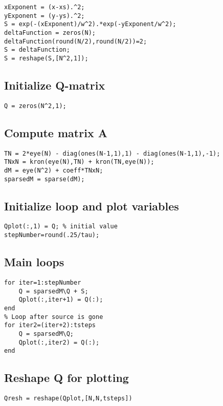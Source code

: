 \begin{verbatim}
xExponent = (x-xs).^2;
yExponent = (y-ys).^2;
S = exp(-(xExponent)/w^2).*exp(-yExponent/w^2);
deltaFunction = zeros(N);
deltaFunction(round(N/2),round(N/2))=2;
S = deltaFunction;
S = reshape(S,[N^2,1]);
\end{verbatim}


\subsection*{Initialize Q-matrix}

\begin{verbatim}
Q = zeros(N^2,1);
\end{verbatim}


\subsection*{Compute matrix A}

\begin{verbatim}
TN = 2*eye(N) - diag(ones(N-1,1),1) - diag(ones(N-1,1),-1);
TNxN = kron(eye(N),TN) + kron(TN,eye(N));
dM = eye(N^2) + coeff*TNxN;
sparsedM = sparse(dM);
\end{verbatim}


\subsection*{Initialize loop and plot variables}

\begin{verbatim}
Qplot(:,1) = Q; % initial value
stepNumber=round(.25/tau);
\end{verbatim}


\subsection*{Main loops}

\begin{verbatim}
for iter=1:stepNumber
    Q = sparsedM\Q + S;
    Qplot(:,iter+1) = Q(:);
end
% Loop after source is gone
for iter2=(iter+2):tsteps
    Q = sparsedM\Q;
    Qplot(:,iter2) = Q(:);
end
\end{verbatim}


\subsection*{Reshape Q for plotting}

\begin{verbatim}
Qresh = reshape(Qplot,[N,N,tsteps])
\end{verbatim}


